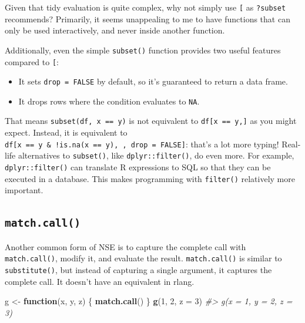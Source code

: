 \documentclass[]{book}
\makeatletter
\newenvironment{Shaded}{\begin{snugshade}}{\end{snugshade}}
\newcommand{\CommentTok}[1]{\textcolor[rgb]{0.37,0.37,0.37}{\textit{#1}}}
\newcommand{\ControlFlowTok}[1]{\textcolor[rgb]{0.27,0.27,0.27}{\textbf{#1}}}
\newcommand{\DataTypeTok}[1]{\textcolor[rgb]{0.27,0.27,0.27}{#1}}
\newcommand{\DecValTok}[1]{\textcolor[rgb]{0.06,0.06,0.06}{#1}}
\newcommand{\KeywordTok}[1]{\textcolor[rgb]{0.27,0.27,0.27}{\textbf{#1}}}
\newcommand{\NormalTok}[1]{#1}
\newcommand{\StringTok}[1]{\textcolor[rgb]{0.5,0.5,0.5}{#1}}
\newcommand{\indexc}[1]{\index{#1@\texttt{#1}}}
\makeatother
\begin{document}
Given that tidy evaluation is quite complex, why not simply use \texttt{{[}} as \texttt{?subset} recommends? Primarily, it seems unappealing to me to have functions that can only be used interactively, and never inside another function.

Additionally, even the simple \texttt{subset()} function provides two useful features compared to \texttt{{[}}:

\begin{itemize}
\item
  It sets \texttt{drop\ =\ FALSE} by default, so it's guaranteed to return a data frame.
\item
  It drops rows where the condition evaluates to \texttt{NA}.
\end{itemize}

That means \texttt{subset(df,\ x\ ==\ y)} is not equivalent to \texttt{df{[}x\ ==\ y,{]}} as you might expect. Instead, it is equivalent to \texttt{df{[}x\ ==\ y\ \&\ !is.na(x\ ==\ y),\ ,\ drop\ =\ FALSE{]}}: that's a lot more typing! Real-life alternatives to \texttt{subset()}, like \texttt{dplyr::filter()}, do even more. For example, \texttt{dplyr::filter()} can translate R expressions to SQL so that they can be executed in a database. This makes programming with \texttt{filter()} relatively more important.

\hypertarget{match.call}{%
\subsection{\texorpdfstring{\texttt{match.call()}}{match.call()}}\label{match.call}}

\indexc{match.call()}

Another common form of NSE is to capture the complete call with \texttt{match.call()}, modify it, and evaluate the result. \texttt{match.call()} is similar to \texttt{substitute()}, but instead of capturing a single argument, it captures the complete call. It doesn't have an equivalent in rlang.

\begin{Shaded}
\begin{Highlighting}[]
\NormalTok{g <-}\StringTok{ }\ControlFlowTok{function}\NormalTok{(x, y, z) \{}
  \KeywordTok{match.call}\NormalTok{()}
\NormalTok{\}}
\KeywordTok{g}\NormalTok{(}\DecValTok{1}\NormalTok{, }\DecValTok{2}\NormalTok{, }\DataTypeTok{z =} \DecValTok{3}\NormalTok{)}
\CommentTok{#> g(x = 1, y = 2, z = 3)}
\end{Highlighting}
\end{Shaded}
\end{document}
